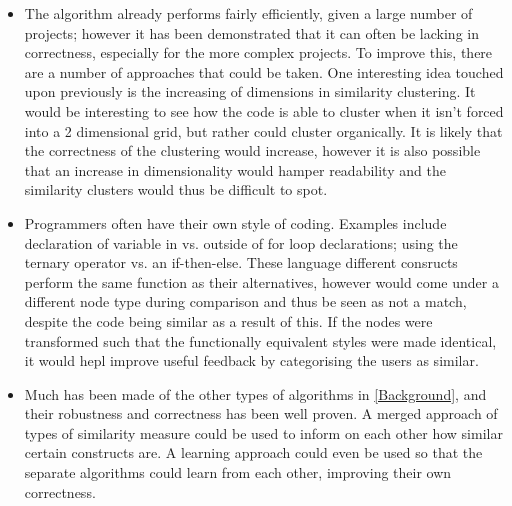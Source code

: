 \begin{itemize}
\item
The algorithm already performs fairly efficiently, given a large number of 
projects; however it has been demonstrated that it can often be lacking
in correctness, especially for the more complex projects. To improve this,
there are a number of approaches that could be taken. One interesting idea
touched upon previously is the increasing of dimensions in similarity clustering.
It would be interesting to see how the code is able to cluster when it isn't forced
into a 2 dimensional grid, but rather could cluster organically. It is likely
that the correctness of the clustering would increase, however it is also possible 
that an increase in dimensionality would hamper readability and the similarity
clusters would thus be difficult to spot.

\item
Programmers often have their own style of coding. Examples include
declaration of variable in vs. outside of for loop declarations;
using the ternary operator vs. an if-then-else. These language
different consructs perform the same function as their alternatives,
however would come under a different node type during comparison
and thus be seen as not a match, despite the code being similar as a result of
this. If the nodes were transformed such that the functionally equivalent
styles were made identical, it would hepl improve useful feedback by
categorising the users as similar.

\item
Much has been made of the other types of algorithms in \cref{Background}, and
their robustness and correctness has been well proven. A merged approach of types
of similarity measure could be used to inform on each other how similar certain
constructs are. A learning approach could even be used so that the separate algorithms
could learn from each other, improving their own correctness.
\end{itemize}




